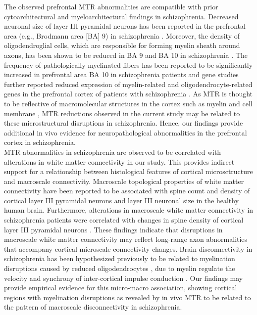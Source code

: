 \begin{refsection}
The observed prefrontal MTR abnormalities are compatible with prior cytoarchitectural and myeloarchitectural findings in schizophrenia. Decreased neuronal size of layer III pyramidal neurons has been reported in the prefrontal area (e.g., Brodmann area [BA] 9) in schizophrenia \citep{Pierri2001DecreasedSS,Rajkowska1998NeuronalAG}. Moreover, the density of oligodendroglial cells, which are responsible for forming myelin sheath around axons, has been shown to be reduced in BA 9 and BA 10 in schizophrenia \citep{Hof2003LossAA,Uranova2001ElectronMO,Uranova2004OligodendroglialDI}. The frequency of pathologically myelinated fibers has been reported to be significantly increased in prefrontal area BA 10 in schizophrenia patients \citep{Uranova2011UltrastructuralAO} and gene studies further reported reduced expression of myelin-related and oligodendrocyte-related genes in the prefrontal cortex of patients with schizophrenia \citep{Pierri2001DecreasedSS,Mimmack2002GeneEA,Pongrac2002GeneEP}. As MTR is thought to be reflective of macromolecular structures in the cortex such as myelin and cell membrane \citep{wolff1994magnetization}, MTR reductions observed in the current study may be related to these microstructural disruptions in schizophrenia. Hence, our findings provide additional in vivo evidence for neuropathological abnormalities in the prefrontal cortex in schizophrenia. \\

MTR abnormalities in schizophrenia are observed to be correlated with alterations in white matter connectivity in our study. This provides indirect support for a relationship between histological features of cortical microsctructure and macroscale connectivity. Macroscale topological properties of white matter connectivity have been reported to be associated with spine count and density of cortical layer III pyramidal neurons \citep{VANDENHEUVEL2016293} and layer III neuronal size \citep{Heuvel2015BridgingCA} in the healthy human brain. Furthermore, alterations in macroscale white matter connectivity in schizophrenia patients were correlated with changes in spine density of cortical layer III pyramidal neurons \citep{VANDENHEUVEL2016293}. These findings indicate that disruptions in macroscale white matter connectivity may reflect long-range axon abnormalities that accompany cortical microscale connectivity changes. Brain disconnectivity in schizophrenia has been hypothesized previously to be related to myelination disruptions caused by reduced oligodendrocytes \citep{Cassoli2015DisturbedMI}, due to myelin regulate the velocity and synchrony of inter-cortical impulse conduction \citep{Fields2008WhiteMI}. Our findings may provide empirical evidence for this micro-macro association, showing cortical regions with myelination disruptions as revealed by in vivo MTR to be related to the pattern of macroscale disconnectivity in schizophrenia. \\


\end{refsection}
